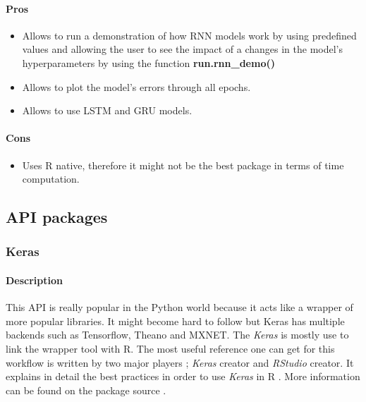 \documentclass[letter,8pt]{article}\usepackage[]{graphicx}\usepackage[]{color}
\begin{document}
\paragraph{Pros}
\begin{itemize}
\item Allows to run a demonstration of how RNN models work by using predefined values and allowing the user to see the impact of a changes in the model's hyperparameters by using the function \textbf{run.rnn\_demo()}
\item Allows to plot the model's errors through all epochs.
\item Allows to use LSTM and GRU models.
\end{itemize}
\paragraph{Cons}
\begin{itemize}
\item Uses R native, therefore it might not be the best package in terms of time computation.
\end{itemize}

\subsection{API packages}

\subsubsection{Keras}
\paragraph{Description}
This API is really popular in the Python world because it acts like a wrapper of more popular libraries. It might become hard to follow but Keras has multiple backends such as Tensorflow, Theano and MXNET. The \textit{Keras} is mostly use to link the wrapper tool with R. The most useful reference one can get for this workflow is written by two major players ; \textit{Keras} creator and \textit{RStudio} creator. It explains in detail the best practices in order to use \textit{Keras} in R \cite{chollet2018deep}. More information can be found on the package source \cite{keras2019}.
\end{document}
